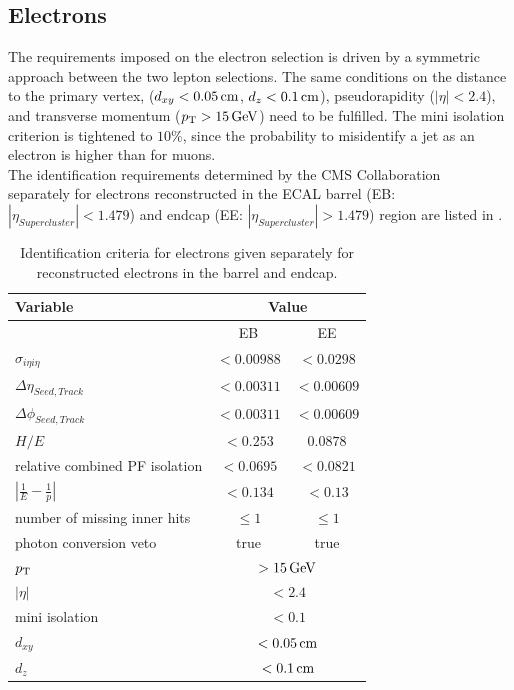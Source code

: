 \subsection{Electrons}
The requirements imposed on the electron selection is driven by a symmetric approach between the two lepton selections. The same conditions on the distance to the primary vertex, ($d_{xy}<0.05\,\text{cm}$, $d_z<0.1\,\text{cm}$), pseudorapidity ($|\eta|<2.4$), and transverse momentum ($p_{\mathrm{T}}>15\,\text{Ge\hspace{-.08em}V}$) need to be fulfilled. The mini isolation criterion is tightened to $10\%$, since the probability to misidentify a jet as an electron is higher than for muons.\\
The identification requirements determined by the CMS Collaboration~\cite{ElectronID} separately for electrons reconstructed in the ECAL barrel (EB: $|\eta_{Supercluster}|<1.479$) and endcap (EE: $|\eta_{Supercluster}|>1.479$) region are listed in .
\begin{table}[bp]
 \centering
 \caption{Identification criteria for electrons given separately for reconstructed electrons in the barrel and endcap.}
 \label{tab:eleID}
 \begin{tabular}{lcc}
  Variable                       & \multicolumn{2}{c}{Value}                   \\\hline
                                 & EB                             & EE         \\\hline
  $\sigma_{i\eta i\eta}$         & $<0.00988$                     & $<0.0298$  \\
  $\Delta\eta_{Seed,Track}$      & $<0.00311$                     & $<0.00609$ \\
  $\Delta\phi_{Seed,Track}$      & $<0.00311$                     & $<0.00609$ \\
  $H/E$                          & $<0.253$                       & $0.0878$   \\
  relative combined PF isolation & $<0.0695$                      & $<0.0821$  \\
  $|\frac{1}{E}-\frac{1}{p}|$    & $<0.134$                       & $<0.13$    \\
  number of missing inner hits   & $\leq1$                        & $\leq1$    \\
  photon conversion veto         & true                           & true       \\\hline
  $p_{\mathrm{T}}$                          & \multicolumn{2}{c}{$>15\,\text{Ge\hspace{-.08em}V}$}               \\
  $|\eta|$                       & \multicolumn{2}{c}{$<2.4$}                  \\
  mini isolation                 & \multicolumn{2}{c}{$<0.1$}                  \\
  $d_{xy}$                       & \multicolumn{2}{c}{$<0.05\,\text{cm}$}              \\
  $d_z$                          & \multicolumn{2}{c}{$<0.1\,\text{cm}$}               \\\hline
 \end{tabular}
 \vspace{\baselineskip}
\end{table}
